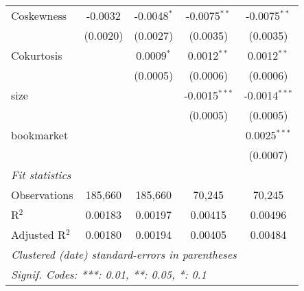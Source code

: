 \begin{table}[H]
\begin{tabular}{lcccc}
      Coskewness     & -0.0032       & -0.0048$^{*}$ & -0.0075$^{**}$  & -0.0075$^{**}$\\   
                     & (0.0020)      & (0.0027)      & (0.0035)        & (0.0035)\\   
      Cokurtosis     &               & 0.0009$^{*}$  & 0.0012$^{**}$   & 0.0012$^{**}$\\   
                     &               & (0.0005)      & (0.0006)        & (0.0006)\\   
      size           &               &               & -0.0015$^{***}$ & -0.0014$^{***}$\\   
                     &               &               & (0.0005)        & (0.0005)\\   
      bookmarket     &               &               &                 & 0.0025$^{***}$\\   
                     &               &               &                 & (0.0007)\\   
      \midrule
      \emph{Fit statistics}\\
      Observations   & 185,660       & 185,660       & 70,245          & 70,245\\  
      R$^2$          & 0.00183       & 0.00197       & 0.00415         & 0.00496\\  
      Adjusted R$^2$ & 0.00180       & 0.00194       & 0.00405         & 0.00484\\  
      \midrule \midrule
      \multicolumn{5}{l}{\emph{Clustered (date) standard-errors in parentheses}}\\
      \multicolumn{5}{l}{\emph{Signif. Codes: ***: 0.01, **: 0.05, *: 0.1}}\\
   \end{tabular}
\end{table}

